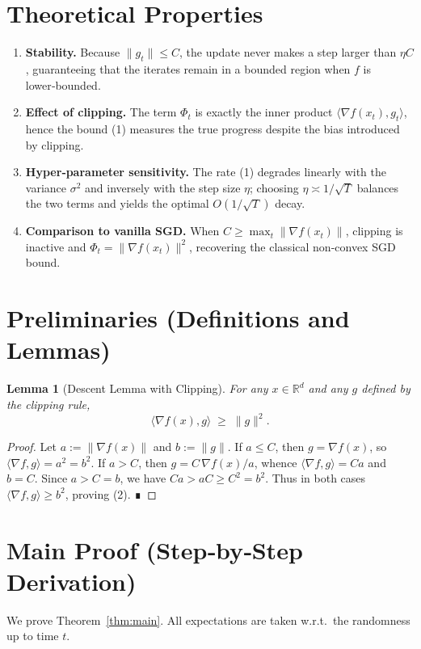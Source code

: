 \documentclass{article}
\newtheorem{lemma}{Lemma}
\begin{document}
\section*{Theoretical Properties}
\begin{enumerate}[label={P\arabic*}.]
\item \textbf{Stability.} Because $\|g_{t}\|\le C$, the update never makes a step larger than $\eta C$, guaranteeing that the iterates remain in a bounded region when $f$ is lower‑bounded.
\item \textbf{Effect of clipping.} The term $\Phi_{t}$ is exactly the inner product 
$\langle\nabla f(x_{t}),g_{t}\rangle$, hence the bound (1) measures the true progress
despite the bias introduced by clipping.
\item \textbf{Hyper‑parameter sensitivity.} The rate (1) degrades linearly with the variance $\sigma^{2}$ and inversely with the step size $\eta$; choosing $\eta\asymp 1/\sqrt{T}$ balances the two terms and yields the optimal $O(1/\sqrt{T})$ decay.
\item \textbf{Comparison to vanilla SGD.} When $C\ge \max_{t}\|\nabla f(x_{t})\|$, clipping is inactive and $\Phi_{t}=\|\nabla f(x_{t})\|^{2}$, recovering the classical non‑convex SGD bound.
\end{enumerate}

\section*{Preliminaries (Definitions and Lemmas)}
\begin{lemma}[Descent Lemma with Clipping]\label{lem:descent}
For any $x\in\mathbb{R}^{d}$ and any $g$ defined by the clipping rule,
\[
\langle\nabla f(x),g\rangle\;\ge\;\|g\|^{2}.
\tag{2}
\]
\end{lemma}
\begin{proof}
Let $a:=\|\nabla f(x)\|$ and $b:=\|g\|$.  
If $a\le C$, then $g=\nabla f(x)$, so $\langle\nabla f,g\rangle=a^{2}=b^{2}$.  
If $a>C$, then $g=C\,\nabla f(x)/a$, whence $\langle\nabla f,g\rangle=Ca$ and $b=C$.  
Since $a>C=b$, we have $Ca>aC\ge C^{2}=b^{2}$.  
Thus in both cases $\langle\nabla f,g\rangle\ge b^{2}$, proving (2). ∎
\end{proof}

\section*{Main Proof (Step‑by‑Step Derivation)}
We prove Theorem~\ref{thm:main}. All expectations are taken w.r.t.\ the randomness up to time $t$.
\end{document}
